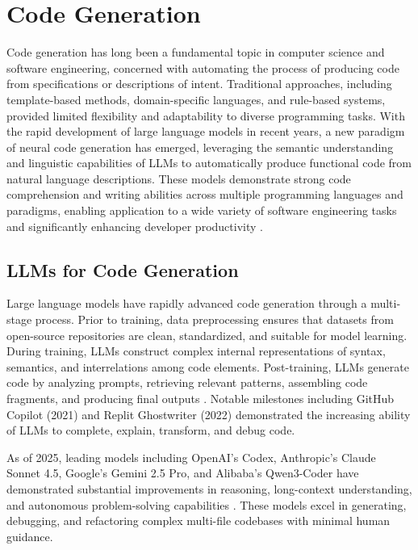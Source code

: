 \section{Code Generation}

Code generation has long been a fundamental topic in computer science and software engineering, concerned with automating the process of producing code from specifications or descriptions of intent. Traditional approaches, including template-based methods, domain-specific languages, and rule-based systems, provided limited flexibility and adaptability to diverse programming tasks. With the rapid development of large language models in recent years, a new paradigm of neural code generation has emerged, leveraging the semantic understanding and linguistic capabilities of LLMs to automatically produce functional code from natural language descriptions. These models demonstrate strong code comprehension and writing abilities across multiple programming languages and paradigms, enabling application to a wide variety of software engineering tasks and significantly enhancing developer productivity \cite{10403378}.


\subsection{LLMs for Code Generation}

Large language models have rapidly advanced code generation through a multi-stage process. Prior to training, data preprocessing ensures that datasets from open-source repositories are clean, standardized, and suitable for model learning. During training, LLMs construct complex internal representations of syntax, semantics, and interrelations among code elements. Post-training, LLMs generate code by analyzing prompts, retrieving relevant patterns, assembling code fragments, and producing final outputs \cite{huynh2025largelanguagemodelscode}. Notable milestones including GitHub Copilot (2021) and Replit Ghostwriter (2022) demonstrated the increasing ability of LLMs to complete, explain, transform, and debug code.

As of 2025, leading models including OpenAI's Codex, Anthropic's Claude Sonnet 4.5, Google's Gemini 2.5 Pro, and Alibaba's Qwen3-Coder have demonstrated substantial improvements in reasoning, long-context understanding, and autonomous problem-solving capabilities \cite{openai2025codex, anthropic2025claude, google2025gemini, alibaba2025qwen}. These models excel in generating, debugging, and refactoring complex multi-file codebases with minimal human guidance. 

